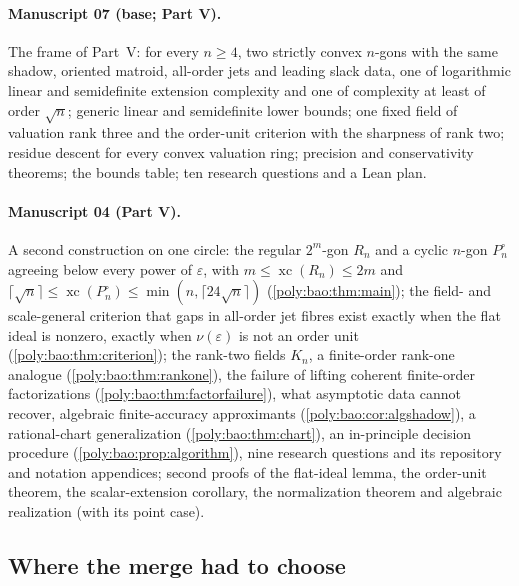 \documentclass[11pt,a4paper]{article}
\numberwithin{equation}{section}
\theoremstyle{plain}
\newcommand{\eps}{\varepsilon}
\newcommand{\xc}{\operatorname{xc}}
\begin{document}
\paragraph{Manuscript 07 (base; Part V).} The frame of Part~V: for every
$n\ge4$, two strictly convex $n$-gons with the same shadow, oriented
matroid, all-order jets and leading slack data, one of logarithmic linear
and semidefinite extension complexity and one of complexity at least of
order $\sqrt n$; generic linear and semidefinite lower bounds; one fixed
field of valuation rank three and the order-unit criterion with the
sharpness of rank two; residue descent for every convex valuation ring;
precision and conservativity theorems; the bounds table; ten research
questions and a Lean plan.

\paragraph{Manuscript 04 (Part V).} A second construction on one circle: the regular
$2^m$-gon $R_n$ and a cyclic $n$-gon $P^\circ_n$ agreeing below every power
of $\eps$, with $m\le\xc(R_n)\le2m$ and
$\lceil\sqrt n\rceil\le\xc(P^\circ_n)\le\min(n,\lceil24\sqrt n\rceil)$
(\cref{poly:bao:thm:main}); the field- and scale-general criterion that
gaps in all-order jet fibres exist exactly when the flat ideal is nonzero,
exactly when $\nu(\eps)$ is not an order unit (\cref{poly:bao:thm:criterion});
the rank-two fields $K_n$, a finite-order rank-one analogue
(\cref{poly:bao:thm:rankone}), the failure of lifting coherent finite-order
factorizations (\cref{poly:bao:thm:factorfailure}), what asymptotic data
cannot recover, algebraic finite-accuracy approximants
(\cref{poly:bao:cor:algshadow}), a rational-chart generalization
(\cref{poly:bao:thm:chart}), an in-principle decision procedure
(\cref{poly:bao:prop:algorithm}), nine research questions and its
repository and notation appendices; second proofs of the flat-ideal lemma,
the order-unit theorem, the scalar-extension corollary, the normalization
theorem and algebraic realization (with its point case).


\subsection{Where the merge had to choose}
\end{document}

